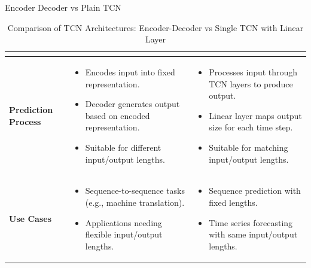 \documentclass[8pt,xcolor=dvipsnames,compress]{beamer}
\begin{document}
\begin{frame}[fragile]{Encoder Decoder vs Plain TCN}
\begin{table}[ht]
\begin{tabular}{|p{1cm}|p{4.5cm}|p{4.5cm}|}
\begin{itemize}
        \end{itemize} \\
        \hline
        \textbf{Prediction Process} & 
        \begin{itemize}
            \item Encodes input into fixed representation.
            \item Decoder generates output based on encoded representation.
            \item Suitable for different input/output lengths.
        \end{itemize} & 
        \begin{itemize}
            \item Processes input through TCN layers to produce output.
            \item Linear layer maps output size for each time step.
            \item Suitable for matching input/output lengths.
        \end{itemize} \\
        \hline
        \textbf{Use Cases} & 
        \begin{itemize}
            \item Sequence-to-sequence tasks (e.g., machine translation).
            \item Applications needing flexible input/output lengths.
        \end{itemize} & 
        \begin{itemize}
            \item Sequence prediction with fixed lengths.
            \item Time series forecasting with same input/output lengths.
        \end{itemize} \\
        \hline
    \end{tabular}
    \caption{Comparison of TCN Architectures: Encoder-Decoder vs Single TCN with Linear Layer}
    \label{tab:tcn_comparison}
\end{table}
\end{frame}
\end{document}

